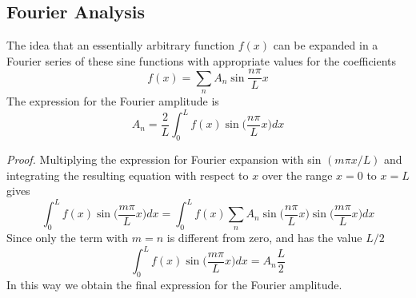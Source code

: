 \documentclass[../../../main.tex]{subfiles}
\begin{document}
\subsection{Fourier Analysis}
The idea that an essentially arbitrary function $f (x)$ can be expanded in a Fourier series of these sine functions with appropriate values for the coefficients
\begin{equation*}
    f(x)=\sum_{n}A_n\sin \frac{n\pi}{L}x
\end{equation*}
The expression for the Fourier amplitude is 
\begin{equation*}
    A_n=\frac{2}{L}\int_{0}^{L}f(x)\sin \biggl(\frac{n\pi}{L}x\biggr)dx
\end{equation*}

\emph{Proof.} Multiplying the expression for Fourier expansion with sin $(m \pi x/L)$ and integrating the resulting equation with respect to $x$ over the range $x = 0$ to $x = L$ gives
\begin{equation*}
    \int_{0}^{L}f(x)\sin \biggl(\frac{m\pi}{L}x\biggr)dx=\int_{0}^{L}f(x)\sum_{n}A_n\sin \biggl(\frac{n\pi}{L}x\biggr)\sin \biggl(\frac{m\pi}{L}x\biggr)dx
\end{equation*}
Since only the term with $m = n$ is different from zero, and has the value $L/2$
\begin{equation*}
    \int_{0}^{L}f(x)\sin \biggl(\frac{m\pi}{L}x\biggr)dx=A_n\frac{L}{2}
\end{equation*}
In this way we obtain the final expression for the Fourier amplitude.
\end{document}
